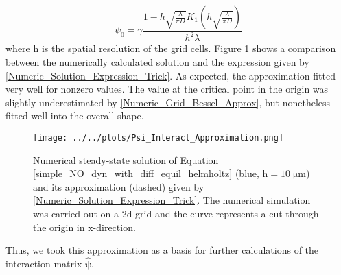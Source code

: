 \documentclass[10pt,a4paper]{article}
\begin{document}
\begin{equation}
\psi_0 = \gamma \frac{1-h\sqrt{\frac{\lambda}{\pi D}} K_1\left( h\sqrt{\frac{\lambda}{\pi D}}\right) }{h^2 \lambda}
\label{Numeric_Grid_Bessel_Approx}
\end{equation}
where $\mathrm{h}$ is the spatial resolution of the grid cells. Figure \ref{Psi_Approximation_Compare} shows a comparison between the numerically calculated solution and the expression given by \ref{Numeric_Solution_Expression_Trick}. As expected, the approximation fitted very well for nonzero values. The value at the critical point in the origin was slightly underestimated by \eqref{Numeric_Grid_Bessel_Approx}, but nonetheless fitted well into the overall shape.
\begin{figure}
\begin{center}
\texttt{[image: ../../plots/Psi\_Interact\_Approximation.png]}
\end{center}
\caption{Numerical steady-state solution of Equation \eqref{simple_NO_dyn_with_diff_equil_helmholtz} (blue, $\mathrm{h=10\;\mu m}$) and its approximation (dashed) given by \eqref{Numeric_Solution_Expression_Trick}. The numerical simulation was carried out on a 2d-grid and the curve represents a cut through the origin in x-direction.}
\label{Psi_Approximation_Compare}
\end{figure}
Thus, we took this approximation as a basis for further calculations of the interaction-matrix $\mathrm{\hat{\psi}}$.
\end{document}
